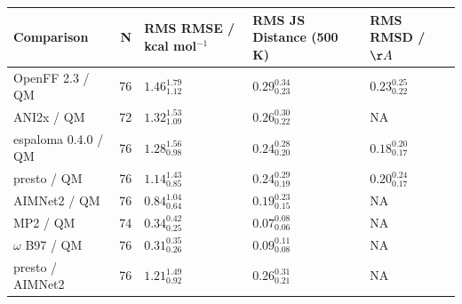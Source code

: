 \begin{tabular}{lrlll}
\toprule
Comparison & N & RMS RMSE / kcal mol$^{-1}$ & RMS JS Distance (500 K) & RMS RMSD / $\AA$ \\
\midrule
OpenFF 2.3 / QM & 76 & $1.46_{1.12}^{1.79}$ & $0.29_{0.23}^{0.34}$ & $0.23_{0.22}^{0.25}$ \\
ANI2x / QM & 72 & $1.32_{1.09}^{1.53}$ & $0.26_{0.22}^{0.30}$ & NA \\
espaloma 0.4.0 / QM & 76 & $1.28_{0.98}^{1.56}$ & $0.24_{0.20}^{0.28}$ & $0.18_{0.17}^{0.20}$ \\
presto / QM & 76 & $1.14_{0.85}^{1.43}$ & $0.24_{0.19}^{0.29}$ & $0.20_{0.17}^{0.24}$ \\
AIMNet2 / QM & 76 & $0.84_{0.64}^{1.04}$ & $0.19_{0.15}^{0.23}$ & NA \\
MP2 / QM & 74 & $0.34_{0.25}^{0.42}$ & $0.07_{0.06}^{0.08}$ & NA \\
$\omega$ B97 / QM & 76 & $0.31_{0.26}^{0.35}$ & $0.09_{0.08}^{0.11}$ & NA \\
presto / AIMNet2 & 76 & $1.21_{0.92}^{1.49}$ & $0.26_{0.21}^{0.31}$ & NA \\
\bottomrule
\end{tabular}
